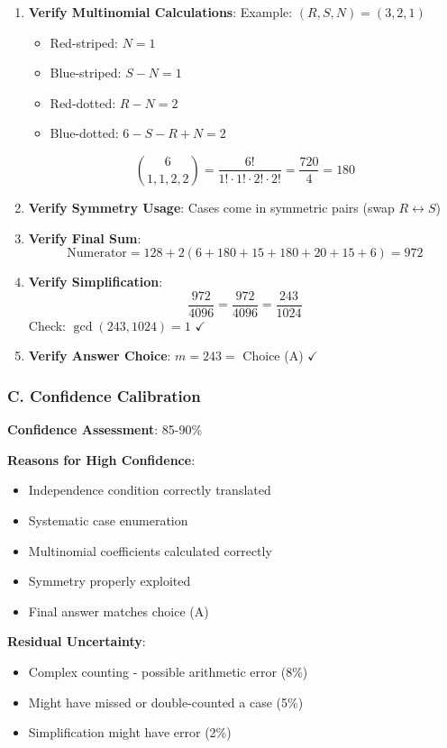 \documentclass[12pt]{article}
\begin{document}
\begin{verificationbox}
\begin{enumerate}
    Total: 15 cases (from solution)
    
    \item \textbf{Verify Multinomial Calculations}:
    Example: $(R, S, N) = (3, 2, 1)$
    \begin{itemize}
        \item Red-striped: $N = 1$
        \item Blue-striped: $S - N = 1$
        \item Red-dotted: $R - N = 2$
        \item Blue-dotted: $6 - S - R + N = 2$
    \end{itemize}
    $$\binom{6}{1,1,2,2} = \frac{6!}{1! \cdot 1! \cdot 2! \cdot 2!} = \frac{720}{4} = 180$$
    
    \item \textbf{Verify Symmetry Usage}:
    Cases come in symmetric pairs (swap $R \leftrightarrow S$)
    
    \item \textbf{Verify Final Sum}:
    $$\text{Numerator} = 128 + 2(6 + 180 + 15 + 180 + 20 + 15 + 6) = 972$$
    
    \item \textbf{Verify Simplification}:
    $$\frac{972}{4096} = \frac{972}{4096} = \frac{243}{1024}$$
    Check: $\gcd(243, 1024) = 1$ $\checkmark$
    
    \item \textbf{Verify Answer Choice}:
    $m = 243 = $ Choice (A) $\checkmark$
\end{enumerate}

\subsubsection*{C. Confidence Calibration}

\textbf{Confidence Assessment}: 85-90\%

\textbf{Reasons for High Confidence}:
\begin{itemize}
    \item Independence condition correctly translated
    \item Systematic case enumeration
    \item Multinomial coefficients calculated correctly
    \item Symmetry properly exploited
    \item Final answer matches choice (A)
\end{itemize}

\textbf{Residual Uncertainty}:
\begin{itemize}
    \item Complex counting - possible arithmetic error (8\%)
    \item Might have missed or double-counted a case (5\%)
    \item Simplification might have error (2\%)
\end{itemize}

\end{verificationbox}
\end{document}
